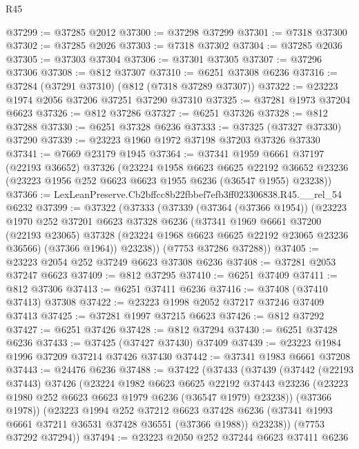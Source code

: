 \begin{lexlean}{R45}
\begin{coremodule}
{@37299 := @37285 @2012
@37300 := @37298 @37299
@37301 := @7318 @37300
@37302 := @37285 @2026
@37303 := @7318 @37302
@37304 := @37285 @2036
@37305 := @37303 @37304
@37306 := @37301 @37305
@37307 := @37296 @37306
@37308 := @812 @37307
@37310 := @6251 @37308 @6236
@37316 := @37284 (@37291 @37310) (@812 (@7318 @37289 @37307))
@37322 := @23223 @1974 @2056 @37206 @37251 @37290 @37310
@37325 := @37281 @1973 @37204 @6623
@37326 := @812 @37286
@37327 := @6251 @37326
@37328 := @812 @37288
@37330 := @6251 @37328 @6236
@37333 := @37325 (@37327 @37330) @37290
@37339 := @23223 @1960 @1972 @37198 @37203 @37326 @37330
@37341 := @7669 @23179 @1945
@37364 := @37341
    @1959
    @6661
    @37197
    (@22193 @36652)
    @37326
    (@23224
      @1958
      @6623
      @6625
      @22192
      @36652
      @23236
      (@23223 @1956 @252 @6623 @6623 @1955 @6236 (@36547 @1955) @23238))
@37366 := LexLeanPreserve.Cb2bffcc8b22fbbef7efb3ff023306838.R45.__rel_54 @6232
@37399 := @37322
    (@37333
      (@37339
        (@37364 (@37366 @1954))
        (@23223
          @1970
          @252
          @37201
          @6623
          @37328
          @6236
          (@37341
            @1969
            @6661
            @37200
            (@22193 @23065)
            @37328
            (@23224 @1968 @6623 @6625 @22192 @23065 @23236 @36566)
            (@37366 @1964))
          @23238))
      (@7753 @37286 @37288))
@37405 := @23223 @2054 @252 @37249 @6623 @37308 @6236
@37408 := @37281 @2053 @37247 @6623
@37409 := @812 @37295
@37410 := @6251 @37409
@37411 := @812 @37306
@37413 := @6251 @37411 @6236
@37416 := @37408 (@37410 @37413) @37308
@37422 := @23223 @1998 @2052 @37217 @37246 @37409 @37413
@37425 := @37281 @1997 @37215 @6623
@37426 := @812 @37292
@37427 := @6251 @37426
@37428 := @812 @37294
@37430 := @6251 @37428 @6236
@37433 := @37425 (@37427 @37430) @37409
@37439 := @23223 @1984 @1996 @37209 @37214 @37426 @37430
@37442 := @37341 @1983 @6661 @37208
@37443 := @24476 @6236
@37488 := @37422
    (@37433
      (@37439
        (@37442
          (@22193 @37443)
          @37426
          (@23224
            @1982
            @6623
            @6625
            @22192
            @37443
            @23236
            (@23223 @1980 @252 @6623 @6623 @1979 @6236 (@36547 @1979) @23238))
          (@37366 @1978))
        (@23223
          @1994
          @252
          @37212
          @6623
          @37428
          @6236
          (@37341 @1993 @6661 @37211 @36531 @37428 @36551 (@37366 @1988))
          @23238))
      (@7753 @37292 @37294))
@37494 := @23223 @2050 @252 @37244 @6623 @37411 @6236
}
\end{coremodule}
\end{lexlean}
